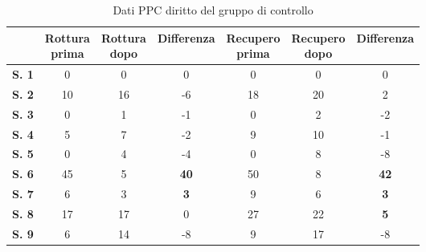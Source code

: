 \begin{table}[H]
\begin{center}
\begin{tabular}{|c|c|c|c|c|c|c|} \hline
{\textbf{}} & \pbox{20cm}{\textbf{Rottura} \\ \textbf{prima}} & \pbox{20cm}{\textbf{Rottura} \\ \textbf{dopo}} & \textbf{Differenza} & \pbox{20cm}{\textbf{Recupero} \\ \textbf{prima}} & \pbox{20cm}{\textbf{Recupero} \\ \textbf{dopo}} & \textbf{Differenza} \\ \hline
\textbf{S. 1} & 0 & 0 & 0 & 0 & 0 & 0 \\ \hline
\textbf{S. 2} & 10 & 16 & -6 & 18 & 20 & 2 \\ \hline
\textbf{S. 3} & 0 & 1 & -1 & 0 & 2 & -2 \\ \hline
\textbf{S. 4} & 5 & 7 & -2 & 9 & 10 & -1 \\ \hline
\textbf{S. 5} & 0 & 4 & -4 & 0 & 8 & -8 \\ \hline
\textbf{S. 6} & 45 & 5 & \textbf{40} & 50 & 8 & \textbf{42}  \\ \hline
\textbf{S. 7} & 6 & 3 & \textbf{3} & 9 & 6 & \textbf{3} \\ \hline
\textbf{S. 8} & 17 & 17 & 0 & 27 & 22 & \textbf{5} \\ \hline
\textbf{S. 9} & 6 & 14 & -8 & 9 & 17 & -8 \\ \hline
\end{tabular}
\end{center}
\caption{Dati PPC diritto del gruppo di controllo}
\end{table}

\\\ \\\  


